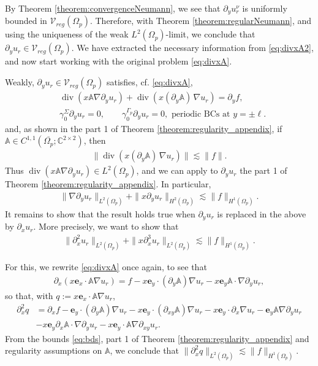 \documentclass[report]{elsarticle}
\numberwithin{theorem}{section}
\renewcommand{\vec}[1]{\mathbf{#1}}
\begin{document}
By Theorem \ref{theorem:convergenceNeumann}, we see that $\partial_y u^{\nu}_r$ is uniformly bounded in $\mathcal{V}_{reg}(\Omega_p)$. Therefore, with Theorem \ref{theorem:regularNeumann}, and using the uniqueness of the weak $L^2(\Omega_p)$-limit, we conclude that $\partial_y u_r\in \mathcal{V}_{reg}(\Omega_p)$. We have extracted the necessary information from \eqref{eq:divxA2}, and now start working with the original problem \eqref{eq:divxA}.

Weakly, $\partial_y u_r\in \mathcal{V}_{reg}(\Omega_p)$ satisfies, cf. \eqref{eq:divxA}, 
\begin{align*}
	&\operatorname{div}(x\mathbb{A}\nabla \partial_y u_r)+\operatorname{div}(x(\partial_y \mathbb{A})\,\nabla u_r)=\partial_y f,\\
	&\gamma_0^{\Sigma}\partial_y u_r=0, \qquad \gamma_0^{\Gamma_p}\partial_y u_r=0, \text{ periodic BCs at }y=\pm \ell. 
\end{align*}
and, as shown in the part 1 of Theorem \ref{theorem:regularity_appendix}, if $\mathbb{A}\in C^{1,1}(\overline{\Omega_p}; \mathbb{C}^{2\times 2})$, then
\begin{align*}
	\|\operatorname{div}(x(\partial_y \mathbb{A})\,\nabla u_r)\|\lesssim \|f\|.
\end{align*}
Thus $	\operatorname{div}(x\mathbb{A}\nabla \partial_y u_r)\in L^2(\Omega_p)$, and we can apply to $\partial_y u_r$ the part 1 of Theorem \ref{theorem:regularity_appendix}. In particular, 
\begin{align}
	\label{eq:bds}
	\|\nabla \partial_y u_r\|_{L^2(\Omega_p)}+\|x \partial_y u_r\|_{H^2(\Omega_p)}\lesssim \|f\|_{H^1(\Omega_p)}. 
\end{align}
It remains to show that the result holds true when $\partial_y u_r$ is replaced in the above by $\partial_x u_r$. More precisely, we want to show that 
\begin{align}
	\label{eq:todo}
	\|\partial_x^2 u_r\|_{L^2(\Omega_p)}+\|x\partial_x^3 u_r\|_{L^2(\Omega_p)}\lesssim \|f\|_{H^1(\Omega_p)}.
\end{align}

 For this, we rewrite \eqref{eq:divxA} once again, to see that 
\begin{align*}
	\partial_x(x\vec{e}_x\cdot \mathbb{A}\nabla u_r)=f-x\vec{e}_y\cdot (\partial_y \mathbb{A})\nabla u_r-x\vec{e}_y\mathbb{A}\cdot \nabla \partial_y u_r,
\end{align*}
so that, with $q:=x\vec{e}_x\cdot \mathbb{A}\nabla u_r$,
\begin{align*}
	\partial_x^2q&=\partial_x f-\vec{e}_y\cdot (\partial_y\mathbb{A})\nabla u_r-x\vec{e}_y\cdot (\partial_{xy}\mathbb{A})\nabla u_r-x\vec{e}_y\cdot \partial_x\nabla u_r-\vec{e}_y\mathbb{A}\nabla \partial_y u_r\\
	&-x\vec{e}_y\partial_x\mathbb{A}\cdot \nabla \partial_y u_r-x\vec{e}_y\cdot \mathbb{A}\nabla \partial_{xy}u_r. 
\end{align*}
From the bounds \eqref{eq:bds}, part 1 of Theorem \ref{theorem:regularity_appendix} and regularity assumptions on $\mathbb{A}$, we conclude that  $\|\partial_x^2 q\|_{L^2(\Omega_p)}\lesssim \|f\|_{H^1(\Omega_p)}.$
\end{document}

